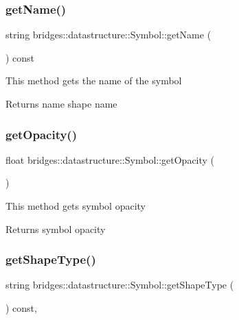 \subsubsection{\texorpdfstring{get\+Name()}{getName()}}
{\footnotesize\ttfamily string bridges\+::datastructure\+::\+Symbol\+::get\+Name (\begin{DoxyParamCaption}{ }\end{DoxyParamCaption}) const\hspace{0.3cm}{\ttfamily [inline]}}

This method gets the name of the symbol

\begin{DoxyReturn}{Returns}
name shape name 
\end{DoxyReturn}
\mbox{\label{classbridges_1_1datastructure_1_1_symbol_af77f6e4c42ca97672888d863335b851a}} 
\subsubsection{\texorpdfstring{get\+Opacity()}{getOpacity()}}
{\footnotesize\ttfamily float bridges\+::datastructure\+::\+Symbol\+::get\+Opacity (\begin{DoxyParamCaption}{ }\end{DoxyParamCaption})\hspace{0.3cm}{\ttfamily [inline]}}

This method gets symbol opacity

\begin{DoxyReturn}{Returns}
symbol opacity 
\end{DoxyReturn}
\mbox{\label{classbridges_1_1datastructure_1_1_symbol_a8f8378ed4009865611ce8b93e4432211}} 
\subsubsection{\texorpdfstring{get\+Shape\+Type()}{getShapeType()}}
{\footnotesize\ttfamily string bridges\+::datastructure\+::\+Symbol\+::get\+Shape\+Type (\begin{DoxyParamCaption}{ }\end{DoxyParamCaption}) const\hspace{0.3cm}{\ttfamily [inline]}, {\ttfamily [protected]}}

